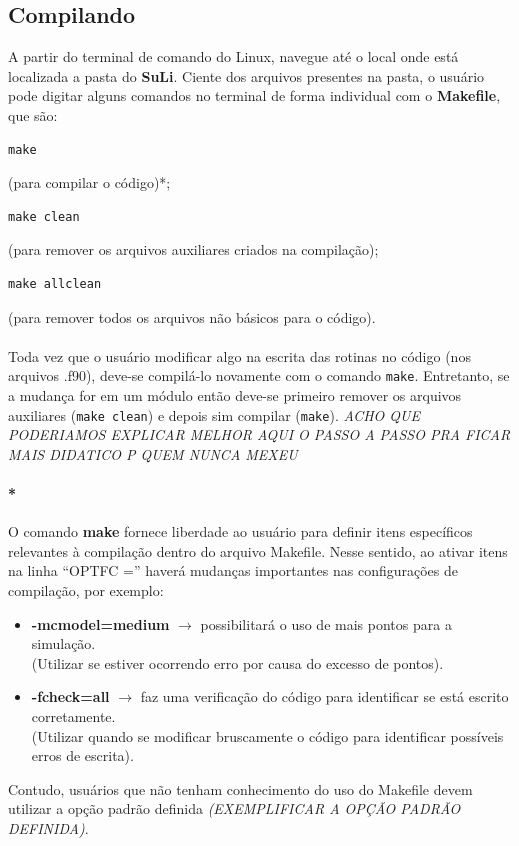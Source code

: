 \documentclass[12pt, a4paper]{article}
\newcommand{\SL}{{\bf SuLi}}
\begin{document}
\subsection{Compilando}
A partir do terminal de comando do Linux, navegue até o local onde está localizada a pasta do \SL . Ciente dos arquivos presentes na pasta, o usuário pode digitar alguns comandos no terminal de forma individual com o {\bf{Makefile}}, que são:
\label{limpar_dados}
\begin{verbatim}
make          
\end{verbatim} 
(para compilar o código)*; 
\begin{verbatim}
make clean
\end{verbatim}
(para remover os arquivos auxiliares criados na compilação);
\begin{verbatim}
make allclean\end{verbatim}
(para remover todos os arquivos não básicos para o código).

\paragraph{} \label{infosmake}Toda vez que o usuário modificar algo na escrita das rotinas no código (nos arquivos .f90), deve-se compilá-lo novamente com o comando \verb!make!. Entretanto, se a mudança for em um módulo então deve-se primeiro remover os arquivos auxiliares (\verb!make clean!) e depois sim compilar (\verb!make!).
\emph{ACHO QUE PODERIAMOS EXPLICAR MELHOR AQUI O PASSO A PASSO PRA FICAR MAIS DIDATICO P QUEM NUNCA MEXEU}

\paragraph{*}	\label{infosmake}
O comando {\bf{make}} fornece liberdade ao usuário para definir itens específicos relevantes à compilação dentro do arquivo Makefile. Nesse sentido, ao ativar itens na linha ``OPTFC ='' haverá mudanças importantes nas configurações de compilação, por exemplo:
\begin{itemize}


\item\textbf{-mcmodel=medium} $\rightarrow$ possibilitará o uso de mais pontos para a simulação. 
\\
(Utilizar se estiver ocorrendo erro por causa do excesso de pontos).
\

\item\textbf{-fcheck=all} $\rightarrow$ faz uma verificação do código para identificar se está escrito corretamente.
\\ (Utilizar quando se modificar bruscamente o código para identificar possíveis erros de escrita).
\

\end{itemize}
Contudo, usuários que não tenham conhecimento do uso do Makefile devem utilizar a opção padrão definida \emph{(EXEMPLIFICAR A OPÇÃO PADRÃO DEFINIDA)}.
\end{document}
